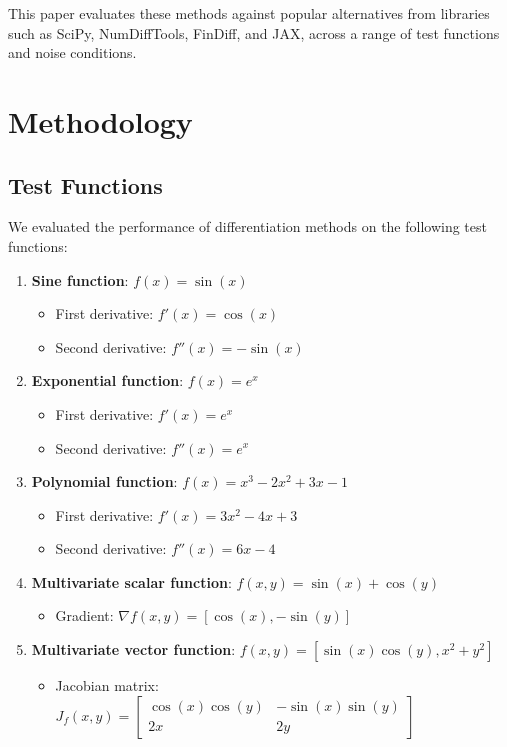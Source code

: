 \documentclass[conference]{IEEEtran}
\begin{document}
This paper evaluates these methods against popular alternatives from libraries such as SciPy, NumDiffTools, FinDiff, and JAX, across a range of test functions and noise conditions.

\section{Methodology}

\subsection{Test Functions}
We evaluated the performance of differentiation methods on the following test functions:

\begin{enumerate}
\item \textbf{Sine function}: $f(x) = \sin(x)$
   \begin{itemize}
   \item First derivative: $f'(x) = \cos(x)$
   \item Second derivative: $f''(x) = -\sin(x)$
   \end{itemize}

\item \textbf{Exponential function}: $f(x) = e^x$
   \begin{itemize}
   \item First derivative: $f'(x) = e^x$
   \item Second derivative: $f''(x) = e^x$
   \end{itemize}

\item \textbf{Polynomial function}: $f(x) = x^3 - 2x^2 + 3x - 1$
   \begin{itemize}
   \item First derivative: $f'(x) = 3x^2 - 4x + 3$
   \item Second derivative: $f''(x) = 6x - 4$
   \end{itemize}

\item \textbf{Multivariate scalar function}: $f(x,y) = \sin(x) + \cos(y)$
   \begin{itemize}
   \item Gradient: $\nabla f(x,y) = [\cos(x), -\sin(y)]$
   \end{itemize}

\item \textbf{Multivariate vector function}: $f(x,y) = [\sin(x)\cos(y), x^2 + y^2]$
   \begin{itemize}
   \item Jacobian matrix:
     $J_f(x,y) = \begin{bmatrix} \cos(x)\cos(y) & -\sin(x)\sin(y) \\ 2x & 2y \end{bmatrix}$
   \end{itemize}
\end{enumerate}
\end{document}
